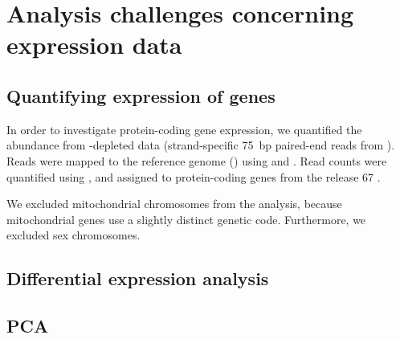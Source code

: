 \chapter{Analysis challenges concerning  expression data}
\label{sec:trna-analysis}

\section{Quantifying expression of \mrna genes}

In order to investigate protein-coding gene expression, we quantified the \mrna
abundance from \rrna-depleted \rnaseq data (strand-specific \SI{75}{bp}
paired-end reads from  ). Reads were mapped to
the \mmu reference genome () using 
\citep{Fonseca:2014} and  \citep{Kim:2013}. Read counts were
quantified using  \citep{Anders:2014}, and assigned to
protein-coding genes from the  release \num{67}
\citep{Flicek:2014}.

We excluded mitochondrial chromosomes from the analysis, because mitochondrial
genes use a slightly distinct genetic code. Furthermore, we excluded
sex chromosomes.

%
%
%

\section{Differential expression analysis}

\section{PCA}

